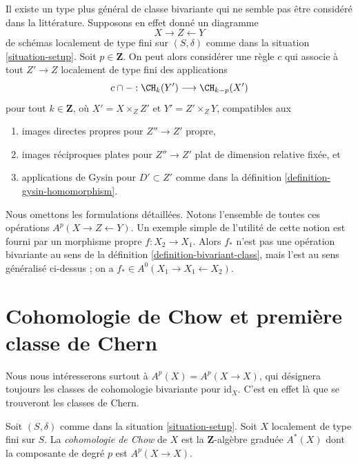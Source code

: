 \begin{remark}
\label{remark-more-general-bivariant}
Il existe un type plus général de classe bivariante qui ne semble pas être
considéré dans la littérature. Supposons en effet donné un diagramme
$$
X \longrightarrow Z \longleftarrow Y
$$
de schémas localement de type fini sur $(S, \delta)$ comme dans la
situation \ref{situation-setup}. Soit $p \in \mathbf{Z}$.
On peut alors considérer une règle $c$ qui associe à tout $Z' \to Z$
localement de type fini des applications
$$
c \cap - : \CH_k(Y') \longrightarrow \CH_{k - p}(X')
$$
pour tout $k \in \mathbf{Z}$,
où $X' = X \times_Z Z'$ et $Y' = Z' \times_Z Y$, compatibles aux
\begin{enumerate}
\item images directes propres pour $Z'' \to Z'$ propre,
\item images réciproques plates pour $Z'' \to Z'$ plat
de dimension relative fixée, et
\item applications de Gysin pour $D' \subset Z'$ comme dans la
définition \ref{definition-gysin-homomorphism}.
\end{enumerate}
Nous omettons les formulations détaillées. Notons l'ensemble
de toutes ces opérations $A^p(X \to Z \leftarrow Y)$. Un exemple simple
de l'utilité de cette notion est fourni par un morphisme propre
$f : X_2 \to X_1$. Alors $f_*$ n'est pas une opération bivariante au sens de la
définition \ref{definition-bivariant-class}, mais l'est au sens
généralisé ci-dessus ; on a $f_* \in A^0(X_1 \to X_1 \leftarrow X_2)$.
\end{remark}





\section{Cohomologie de Chow et première classe de Chern}
\label{section-chow-cohomology}

\noindent
Nous nous intéresserons surtout à $A^p(X) = A^p(X \to X)$, qui désignera toujours
les classes de cohomologie bivariante pour $\text{id}_X$. C'est en effet là que
se trouveront les classes de Chern.

\begin{definition}
\label{definition-chow-cohomology}
Soit $(S, \delta)$ comme dans la situation \ref{situation-setup}.
Soit $X$ localement de type fini sur $S$. La {\it cohomologie de Chow}
de $X$ est la $\mathbf{Z}$-algèbre graduée $A^*(X)$ dont la composante de degré
$p$ est $A^p(X \to X)$.
\end{definition}

